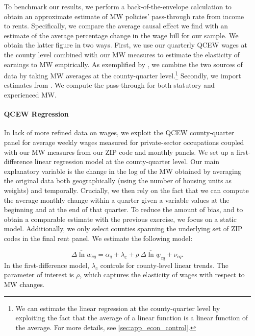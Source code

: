 To benchmark our results, we perform a back-of-the-envelope calculation to obtain an 
approximate estimate of MW policies' pass-through rate from income to rents. Specifically, 
we compare the average causal effect we find with an estimate of the average percentage 
change in the wage bill for our sample. We obtain the latter figure in two ways. First, we 
use our quarterly QCEW wages at the county level combined with our MW measures 
to estimate the elasticity of earnings to MW empirically. As exemplified by 
\textcite{gentzkow2015newspapers}, we combine the two sources of data by taking MW averages 
at the county-quarter level.\footnote{We can estimate the linear regression at the 
	county-quarter level by exploiting the fact that the average of a linear function is a 
	linear function of the average. For more details, see \autoref{sec:app_econ_control}.} 
Secondly, we import estimates from \textcite{CegnizEtAl2019}. We compute the pass-through for
both statutory and experienced MW.


\paragraph{QCEW Regression} In lack of more refined data on wages, we exploit the QCEW 
county-quarter panel for average weekly wages measured for private-sector occupations coupled 
with our MW measures from our ZIP code and monthly panels. We set up a first-difference linear 
regression model at the county-quarter level. Our main explanatory variable is the change in 
the log of the MW obtained by averaging the original data both geographically (using the number 
of housing units as weights) and temporally. Crucially, we then rely on the fact that we can 
compute the average monthly change within a quarter given a variable values at the beginning 
and at the end of that quarter. To reduce the amount of bias, and to obtain a comparable 
estimate with the previous exercise, we focus on a static model. Additionally, we only 
select counties spanning the underlying set of ZIP codes in the final rent panel. We estimate 
the following model:

\begin{equation}
	\overline{\Delta \ln w}_{cq} = \alpha_{q} + \lambda_{c} 
							+ \rho \ \overline{\Delta \ln \underline{w}}_{cq}
							+ \nu_{cq} .
\end{equation}
In the first-difference model, $\lambda_{c}$ controls for county-level linear trends. 
The parameter of interest is $\rho$, which captures the elasticity of wages with respect to 
MW changes.

